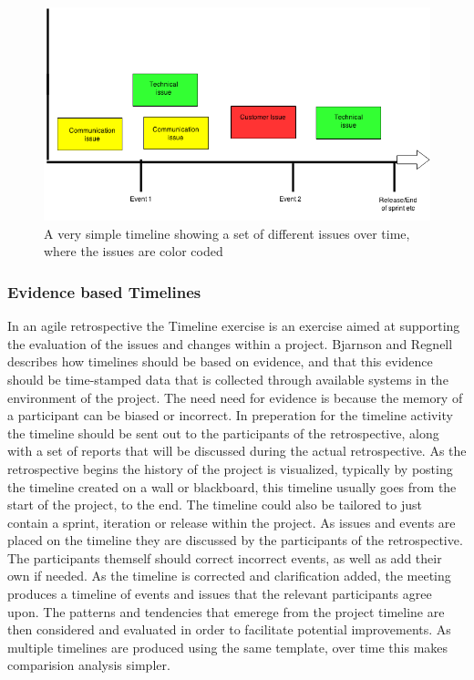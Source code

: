 \documentclass[12pt]{article}
\begin{document}
\begin{figure}[h!]
	\centering
	\includegraphics[width=\textwidth]{figures/Timeline-Example.png}
	\caption{A very simple timeline showing a set of different issues over time, where the issues are color coded}
	\label{figure:Timeline-Example}
\end{figure}

\subsubsection{Evidence based Timelines}
In an agile retrospective the Timeline exercise is an exercise aimed at supporting the evaluation of the issues and changes within a project. Bjarnson and Regnell~\cite{Bjarnason2012} describes how timelines should be based on evidence, and that this evidence should be time-stamped data that is collected through available systems in the environment of the project. The need need for evidence is because the memory of a participant can be biased or incorrect. In preperation for the timeline activity the timeline should be sent out to the participants of the retrospective, along with a set of reports that will be discussed during the actual retrospective. As the retrospective begins the history of the project is visualized, typically by posting the timeline created on a wall or blackboard, this timeline usually goes from the start of the project, to the end. The timeline could also be tailored to just contain a sprint, iteration or release within the project. As issues and events are placed on the timeline they are discussed by the participants of the retrospective. The participants themself should correct incorrect events, as well as add their own if needed. As the timeline is corrected and clarification added, the meeting produces a timeline of events and issues that the relevant participants agree upon. The patterns and tendencies that emerege from the project timeline are then considered and evaluated in order to facilitate potential improvements. As multiple timelines are produced using the same template, over time this makes comparision analysis simpler. 
\end{document}
